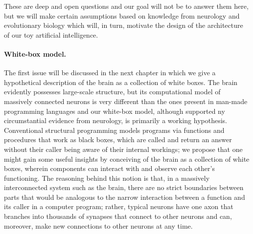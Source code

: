 These are deep and open questions and our goal will not be to answer them here, but we will make certain assumptions based on knowledge from neurology and evolutionary biology which will, in turn, motivate the design of the architecture of our toy artificial intelligence.

\paragraph{White-box model.}%
%
The first issue will be discussed in the next chapter in which we give a hypothetical description of the brain as a collection of white boxes. The brain evidently possesses large-scale structure, but its computational model of massively connected neurons is very different than the ones present in man-made programming languages \cite[Section ``Introducing the Neuron'']{handbookBrainTheory} and our white-box model, although supported ny circumstantial evidence from neurology, is primarily a working hypothesis. Conventional structural programming models programs via functions and procedures that work as black boxes, which are called and return an answer without their caller being aware of their internal workings; we propose that one might gain some useful insights by conceiving of the brain as a collection of white boxes, wherein components can interact with and observe each other's functioning. The reasoning behind this notion is that, in a massively interconnected system such as the brain, there are no strict boundaries between parts that would be analogous to the narrow interaction between a function and its caller in a computer program; rather, typical neurons have one axon that branches into thousands of synapses that connect to other neurons \cite[p.\ 4]{handbookBrainTheory} and can, moreover, make new connections to other neurons at any time.

